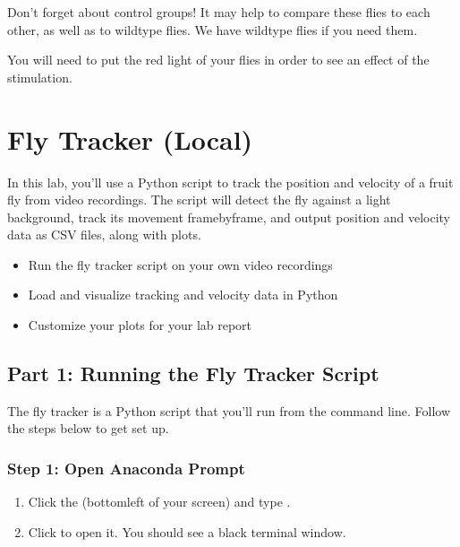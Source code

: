\documentclass[letterpaper,10pt,english]{jupyterBook}
\begin{document}
\sphinxAtStartPar
Don’t forget about control groups! It may help to compare these flies to each other, as well as to wildtype flies. We have wildtype flies if you need them.

\sphinxAtStartPar
You will need to put the red light  of your flies in order to see an effect of the stimulation.

\sphinxstepscope


\section{Fly Tracker (Local)}
\label{\detokenize{FlyTracking/Script:fly-tracker-local}}\label{\detokenize{FlyTracking/Script::doc}}
\sphinxAtStartPar
In this lab, you’ll use a Python script to track the position and velocity of a fruit fly from video recordings. The script will detect the fly against a light background, track its movement frame\sphinxhyphen{}by\sphinxhyphen{}frame, and output position and velocity data as CSV files, along with plots.

\sphinxAtStartPar
{}
\begin{itemize}
\item {} 
\sphinxAtStartPar
Run the fly tracker script on your own video recordings

\item {} 
\sphinxAtStartPar
Load and visualize tracking and velocity data in Python

\item {} 
\sphinxAtStartPar
Customize your plots for your lab report

\end{itemize}




\subsection{Part 1: Running the Fly Tracker Script}
\label{\detokenize{FlyTracking/Script:part-1-running-the-fly-tracker-script}}
\sphinxAtStartPar
The fly tracker is a Python script that you’ll run from the command line. Follow the steps below to get set up.


\subsubsection{Step 1: Open Anaconda Prompt}
\label{\detokenize{FlyTracking/Script:step-1-open-anaconda-prompt}}\begin{enumerate}
%
\item {} 
\sphinxAtStartPar
Click the  (bottom\sphinxhyphen{}left of your screen) and type .

\item {} 
\sphinxAtStartPar
Click  to open it. You should see a black terminal window.

\end{enumerate}
\end{document}
